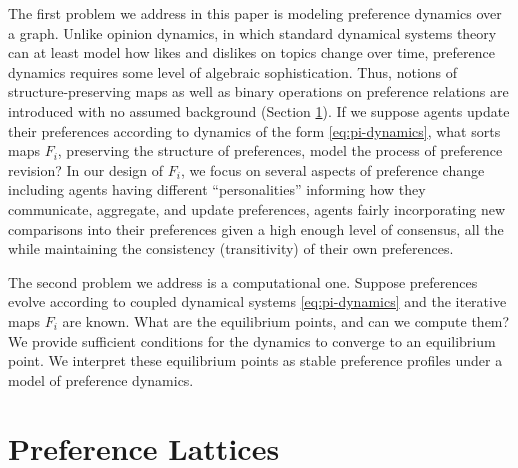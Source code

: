 \documentclass[conference]{ieeeconf}
\newcommand{\N}{\mathcal{N}}
\newcommand{\A}{\mathcal{A}}
\newcommand{\prefers}{\succsim}
\newcommand{\profile}{\boldsymbol{\pi}}
\newcommand{\metaprefers}{\sqsupseteq}
\begin{document}
The first problem we address in this paper is modeling preference dynamics over a graph. Unlike opinion dynamics, in which standard dynamical systems theory can at least model how likes and dislikes on topics change over time, preference dynamics requires some level of algebraic sophistication. Thus, notions of structure-preserving maps as well as binary operations on preference relations are introduced with no assumed background (Section \ref{sec:lattices}). If we suppose agents update their preferences according to dynamics of the form \eqref{eq:pi-dynamics}, what sorts maps $F_i$, preserving the structure of preferences, model the process of preference revision? In our design of $F_i$, we focus on several aspects of preference change including agents having different ``personalities'' informing how they communicate, aggregate, and update preferences, agents fairly incorporating new comparisons into their preferences given a high enough level of consensus, all the while maintaining the consistency (transitivity) of their own preferences.

The second problem we address is a computational one. Suppose preferences evolve according to coupled dynamical systems \eqref{eq:pi-dynamics} and the iterative maps $F_i$ are known. What are the equilibrium points, and can we compute them? We provide sufficient conditions for the dynamics to converge to an equilibrium point. We interpret these equilibrium points as stable preference profiles under a model of preference dynamics.


\section{Preference Lattices}
\label{sec:lattices}
\end{document}
